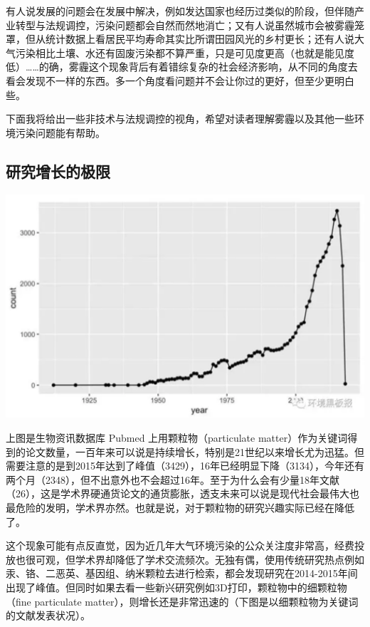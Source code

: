 \documentclass[]{book}
\begin{document}
有人说发展的问题会在发展中解决，例如发达国家也经历过类似的阶段，但伴随产业转型与法规调控，污染问题都会自然而然地消亡；又有人说虽然城市会被雾霾笼罩，但从统计数据上看居民平均寿命其实比所谓田园风光的乡村更长；还有人说大气污染相比土壤、水还有固废污染都不算严重，只是可见度更高（也就是能见度低）\ldots{}\ldots{}的确，雾霾这个现象背后有着错综复杂的社会经济影响，从不同的角度去看会发现不一样的东西。多一个角度看问题并不会让你过的更好，但至少更明白些。

下面我将给出一些非技术与法规调控的视角，希望对读者理解雾霾以及其他一些环境污染问题能有帮助。

\hypertarget{ux7814ux7a76ux589eux957fux7684ux6781ux9650}{%
\subsection{研究增长的极限}\label{ux7814ux7a76ux589eux957fux7684ux6781ux9650}}

\includegraphics[width=6.67in]{images/cw2}

上图是生物资讯数据库 Pubmed 上用颗粒物（particulate matter）作为关键词得到的论文数量，一百年来可以说是持续增长，特别是21世纪以来增长尤为迅猛。但需要注意的是到2015年达到了峰值（3429），16年已经明显下降（3134），今年还有两个月（2348），但不出意外也不会超过16年。至于为什么会有少量18年文献（26），这是学术界硬通货论文的通货膨胀，透支未来可以说是现代社会最伟大也最危险的发明，学术界亦然。也就是说，对于颗粒物的研究兴趣实际已经在降低了。

这个现象可能有点反直觉，因为近几年大气环境污染的公众关注度非常高，经费投放也很可观，但学术界却降低了学术交流频次。无独有偶，使用传统研究热点例如汞、铬、二恶英、基因组、纳米颗粒去进行检索，都会发现研究在2014-2015年间出现了峰值。但同时如果去看一些新兴研究例如3D打印，颗粒物中的细颗粒物（fine particulate matter），则增长还是非常迅速的（下图是以细颗粒物为关键词的文献发表状况）。
\end{document}
